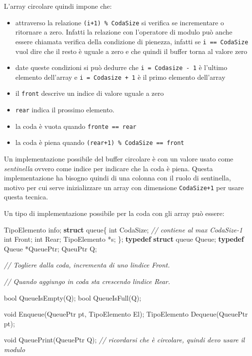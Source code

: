 \documentclass[
]{article}
\newenvironment{Shaded}{}{}
\newcommand{\CommentTok}[1]{\textcolor[rgb]{0.38,0.63,0.69}{\textit{#1}}}
\newcommand{\DataTypeTok}[1]{\textcolor[rgb]{0.56,0.13,0.00}{#1}}
\newcommand{\KeywordTok}[1]{\textcolor[rgb]{0.00,0.44,0.13}{\textbf{#1}}}
\newcommand{\NormalTok}[1]{#1}
\begin{document}
L'array circolare quindi impone che:

\begin{itemize}
\item
  attraverso la relazione \texttt{(i+1)\ \%\ CodaSize} si verifica se
  incrementare o ritornare a zero. Infatti la relazione con l'operatore
  di modulo può anche essere chiamata verifica della condizione di
  pienezza, infatti se \texttt{i\ ==\ CodaSize} vuol dire che il resto è
  uguale a zero e che quindi il buffer torna al valore zero
\item
  date queste condizioni si può dedurre che
  \texttt{i\ =\ Codasize\ -\ 1} è l'ultimo elemento dell'array e
  \texttt{i\ =\ Codasize\ +\ 1} è il primo elemento dell'array
\item
  il \texttt{front} descrive un indice di valore uguale a zero
\item
  \texttt{rear} indica il prossimo elemento.
\item
  la coda è vuota quando \texttt{fronte\ ==\ rear}
\item
  la coda è piena quando \texttt{(rear+1)\ \%\ CodaSize\ ==\ front}
\end{itemize}

Un implementazione possibile del buffer circolare è con un valore usato
come \emph{sentinella} ovvero come indice per indicare che la coda è
piena. Questa implementazione ha bisogno quindi di una colonna con il
ruolo di sentinella, motivo per cui serve inizializzare un array con
dimensione \texttt{CodaSize+1} per usare questa tecnica.

Un tipo di implementazione possibile per la coda con gli array può
essere:

\begin{Shaded}
\begin{Highlighting}[]
\NormalTok{TipoElemento info;}
\KeywordTok{struct}\NormalTok{ queue\{}
    \DataTypeTok{int}\NormalTok{ CodaSize; }\CommentTok{// contiene al max CodaSize{-}1}
    \DataTypeTok{int}\NormalTok{ Front;}
    \DataTypeTok{int}\NormalTok{ Rear;}
\NormalTok{    TipoElemento *s;}
\NormalTok{\};}
\KeywordTok{typedef} \KeywordTok{struct}\NormalTok{ queue Queue;}
\KeywordTok{typedef}\NormalTok{ Queue *QueuePtr;}
\NormalTok{QueuPtr Q;}

\CommentTok{// Togliere dalla coda, incrementa di uno l\textquotesingle{}indice Front.}

\CommentTok{// Quando aggiungo in coda sta crescendo l\textquotesingle{}indice Rear.}

\DataTypeTok{bool}\NormalTok{ QueueIsEmpty(Q);}
\DataTypeTok{bool}\NormalTok{ QueueIsFull(Q);}

\DataTypeTok{void}\NormalTok{ Enqueue(QueuePtr pt, TipoElemento El);}
\NormalTok{TipoElemento Dequeue(QueuePtr pt);}

\DataTypeTok{void}\NormalTok{ QueuePrint(QueuePtr Q); }\CommentTok{// ricordarsi che è circolare, quindi devo usare il modulo}
\end{Highlighting}
\end{Shaded}
\end{document}

